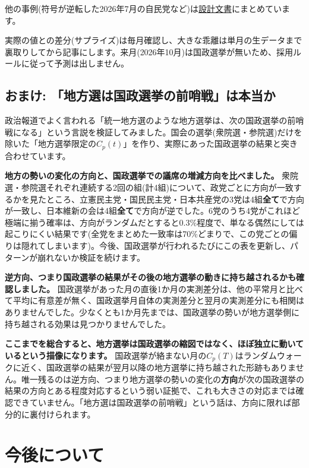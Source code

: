 \documentclass[a4paper,11pt]{ltjsarticle}
\begin{document}
他の事例(符号が逆転した2026年7月の自民党など)は\href{https://github.com/hiromichikimura-lang/seiryoku-shisu/blob/master/design_document.pdf}{設計文書}にまとめています。

実際の値との差分(サプライズ)は毎月確認し、大きな乖離は単月の生データまで裏取りしてから記事にします。来月(2026年10月)は国政選挙が無いため、採用ルールに従って予測は出しません。

\subsection*{おまけ: 「地方選は国政選挙の前哨戦」は本当か}

政治報道でよく言われる「統一地方選のような地方選挙は、次の国政選挙の前哨戦になる」という言説を検証してみました。国会の選挙(衆院選・参院選)だけを除いた「地方選挙限定の$C_p(t)$」を作り、実際にあった国政選挙の結果と突き合わせています。

\textbf{地方の勢いの変化の方向と、国政選挙での議席の増減方向を比べました。} 衆院選・参院選それぞれ連続する2回の組(計4組)について、政党ごとに方向が一致するかを見たところ、立憲民主党・国民民主党・日本共産党の3党は4組\textbf{全て}で方向が一致し、日本維新の会は4組\textbf{全て}で方向が逆でした。6党のうち4党がこれほど極端に揃う確率は、方向がランダムだとすると0.3\%程度で、単なる偶然にしては起こりにくい結果です(全党をまとめた一致率は70\%どまりで、この党ごとの偏りは隠れてしまいます)。今後、国政選挙が行われるたびにこの表を更新し、パターンが崩れないか検証を続けます。

\textbf{逆方向、つまり国政選挙の結果がその後の地方選挙の動きに持ち越されるかも確認しました。} 国政選挙があった月の直後1か月の実測差分は、他の平常月と比べて平均に有意差が無く、国政選挙月自体の実測差分と翌月の実測差分にも相関はありませんでした。少なくとも1か月先までは、国政選挙の勢いが地方選挙側に持ち越される効果は見つかりませんでした。

\textbf{ここまでを総合すると、地方選挙は国政選挙の縮図ではなく、ほぼ独立に動いているという描像になります。} 国政選挙が絡まない月の$C_p(T)$はランダムウォークに近く、国政選挙の結果が翌月以降の地方選挙に持ち越された形跡もありません。唯一残るのは逆方向、つまり地方選挙の勢いの変化の\textbf{方向}が次の国政選挙の結果の方向とある程度対応するという弱い証拠で、これも大きさの対応までは確認できていません。「地方選は国政選挙の前哨戦」という話は、方向に限れば部分的に裏付けられます。

\section*{今後について}
\end{document}
